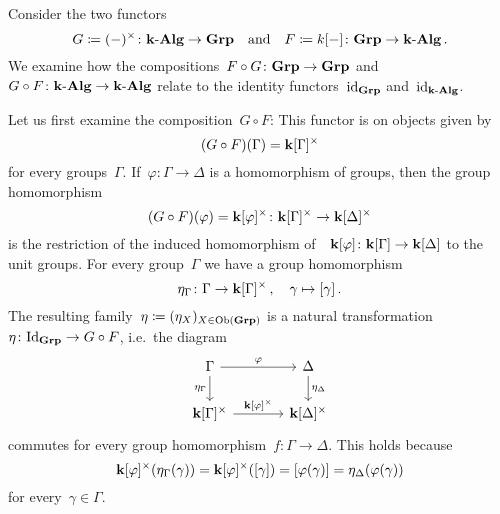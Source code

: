 \begin{example}
  Consider the two functors
  \[
              G
    \coloneqq  (-)^\times
    \colon    \text{$\mathbf{k}$-$\mathbf{Alg}$}
    \to       \mathbf{Grp}
    \quad\text{and}\quad
              F
    \coloneqq  k[-]
    \colon    \mathbf{Grp}
    \to       \text{$\mathbf{k}$-$\mathbf{Alg}$} \,.
  \]
  We examine how the compositions~$F \circ G \colon \mathbf{Grp} \to \mathbf{Grp}$ and~$G \circ F \colon \text{$\mathbf{k}$-$\mathbf{Alg}$} \to \text{$\mathbf{k}$-$\mathbf{Alg}$}$ relate to the identity functors~$\mathrm{id}_{\mathbf{Grp}}$ and~$\mathrm{id}_{\text{$\mathbf{k}$-$\mathbf{Alg}$}}$.
  
  Let us first examine the composition~$G \circ F$:
  This functor is on objects given by
  \[
      (G \circ F)(\Gamma)
    = \mathbf{k}[\Gamma]^\times
  \]
  for every groups~$\Gamma$.
  If~$\varphi \colon \Gamma \to \Delta$ is a homomorphism of groups, then the group homomorphism
  \[
            (G \circ F)(\varphi)
    =       \mathbf{k}[\varphi]^\times
    \colon  \mathbf{k}[\Gamma]^\times
    \to     \mathbf{k}[\Delta]^\times
  \]
  is the restriction of the induced homomorphism of~{\kalgs}~$\mathbf{k}[\varphi] \colon \mathbf{k}[\Gamma] \to \mathbf{k}[\Delta]$ to the unit groups.
  For every group~$\Gamma$ we have a group homomorphism
  \[
            \eta_\Gamma
    \colon  \Gamma
    \to     \mathbf{k}[\Gamma]^\times \,,
    \quad   \gamma
    \mapsto [\gamma] \,.
  \]
  The resulting family~$\eta \coloneqq (\eta_X)_{X \in \operatorname{Ob}(\mathbf{Grp})}$ is a natural transformation~$\eta \colon \mathrm{Id}_{\mathbf{Grp}} \to G \circ F$, i.e.\ the diagram
  \[
    \begin{tikzcd}[column sep = large]
        \Gamma
        \arrow{r}[above]{\varphi}
        \arrow{d}[left]{\eta_\Gamma}
      & \Delta
        \arrow{d}[right]{\eta_\Delta}
      \\
        \kf[\Gamma]^\times
        \arrow{r}[above]{\kf[\varphi]^\times}
      & \kf[\Delta]^\times
    \end{tikzcd}
  \]
  commutes for every group homomorphism~$f \colon \Gamma \to \Delta$.
  This holds because
  \[
      \mathbf{k}[\varphi]^\times( \eta_\Gamma( \gamma ) )
    = \mathbf{k}[\varphi]^\times( [\gamma] )
    = [\varphi(\gamma)]
    = \eta_\Delta( \varphi( \gamma ) )
  \]
  for every~$\gamma \in \Gamma$.
  

\end{example}
